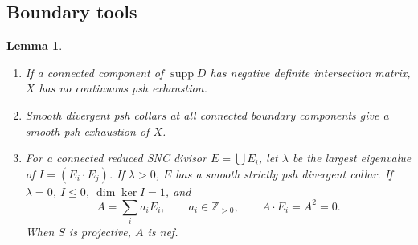 \documentclass[11pt]{amsart}
\newtheorem{lemma}[theorem]{Lemma}
\theoremstyle{definition}
\theoremstyle{remark}
\numberwithin{equation}{section}
\newcommand{\supp}{\operatorname{supp}}
\begin{document}
\subsection{Boundary tools}\label{sec:surface-pair-reduction}
\begin{lemma}\label{lem:surface-boundary-tools}
\begin{enumerate}[label=\textup{(\roman*)},leftmargin=2.5em]
\item\label{item:negative-boundary}
If a connected component of $\supp D$ has negative definite
intersection matrix, $X$ has no continuous psh exhaustion.
\item\label{item:collar-gluing}
Smooth divergent psh collars at all connected boundary components
give a smooth psh exhaustion of $X$.
\item\label{item:matrix-alternatives}
For a connected reduced SNC divisor $E=\bigcup E_i$, let $\lambda$
be the largest eigenvalue of $I=(E_i\cdot E_j)$. If $\lambda>0$,
$E$ has a smooth strictly psh divergent collar. If $\lambda=0$,
$I\le0$, $\dim\ker I=1$, and
\begin{equation}\label{eq:surface-null-boundary}
 A=\sum_i a_iE_i,\qquad a_i\in\mathbb Z_{>0},\qquad
 A\cdot E_i=A^2=0.
\end{equation}
When $S$ is projective, $A$ is nef.
\end{enumerate}
\end{lemma}
\end{document}
